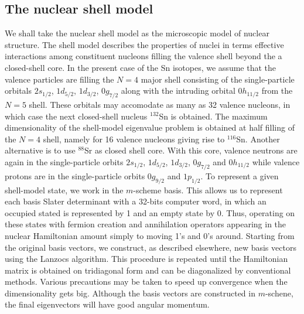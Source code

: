 \subsection{The nuclear shell model}
We shall take the nuclear shell model as the microscopic 
model of nuclear structure. The shell model describes the 
properties of nuclei in terms effective interactions 
among constituent nucleons filling the valence shell  
beyond the a closed-shell core. In the present case of the Sn 
isotopes, we assume that the valence particles are filling 
the $N = 4$ major shell consisting of the single-particle orbitals 
$2s_{1/2}$, $1d_{5/2}$, $1 d_{3/2}$, $0g_{7/2}$ along with the intruding 
orbital $0h_{11/2}$ from the $N = 5$ shell. These orbitals may accomodate 
as many as 32 valence nucleons, in which case the next closed-shell 
nucleus $^{132}$Sn is obtained. The maximum dimensionality of the 
shell-model eigenvalue problem is obtained at half filling of 
the $N = 4$ shell, namely for 16 valence nucleons giving rise to $^{116}$Sn.
Another alternative is to use 
$^{88}$Sr as closed shell core.
With this core, valence neutrons are again in the
single-particle orbits $2s_{1/2}$, $1d_{5/2}$, $1d_{3/2}$,
$0g_{7/2}$ and $0h_{11/2}$ while  valence protons are in the single-particle
orbits $0g_{9/2}$ and $1p_{1/2}$.
To represent a given shell-model state, we
work in the $m$-scheme basis.
This allows us to represent 
each basis Slater determinant with a 32-bits computer word, in which 
an occupied stated is represented by 1 and an empty state by 0. 
Thus, operating on these states with fermion creation and 
annihilation operators appearing in the nuclear Hamiltonian amount 
simply to moving 1's and 0's around. Starting from the original basis 
vectors, we construct, as described elsewhere, new basis vectors 
using the Lanzocs algorithm. This procedure is repeated until the 
Hamiltonian matrix is obtained on tridiagonal form and can be 
diagonalized by conventional methods. Various precautions may be 
taken to speed up convergence when the dimensionality gets big. 
Although the basis vectors are constructed in $m$-schene, 
the final eigenvectors will have good angular momentum.

